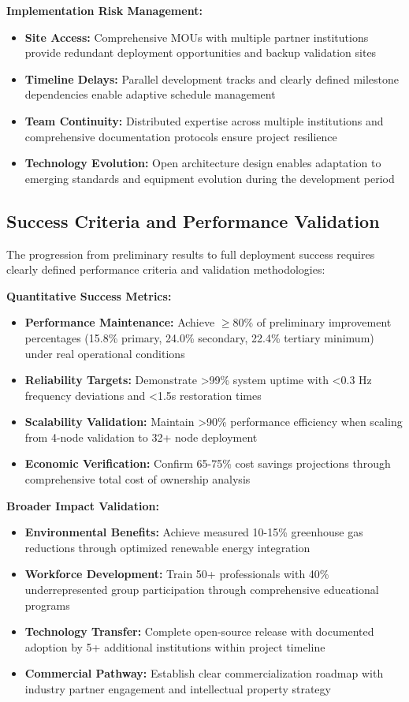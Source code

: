 \documentclass[12pt]{article}
\begin{document}
\textbf{Implementation Risk Management:}
\begin{itemize}
\item \textbf{Site Access:} Comprehensive MOUs with multiple partner institutions provide redundant deployment opportunities and backup validation sites
\item \textbf{Timeline Delays:} Parallel development tracks and clearly defined milestone dependencies enable adaptive schedule management
\item \textbf{Team Continuity:} Distributed expertise across multiple institutions and comprehensive documentation protocols ensure project resilience
\item \textbf{Technology Evolution:} Open architecture design enables adaptation to emerging standards and equipment evolution during the development period
\end{itemize}

\subsection{Success Criteria and Performance Validation}

The progression from preliminary results to full deployment success requires clearly defined performance criteria and validation methodologies:

\textbf{Quantitative Success Metrics:}
\begin{itemize}
\item \textbf{Performance Maintenance:} Achieve $\geq$80\% of preliminary improvement percentages (15.8\% primary, 24.0\% secondary, 22.4\% tertiary minimum) under real operational conditions
\item \textbf{Reliability Targets:} Demonstrate >99\% system uptime with <0.3 Hz frequency deviations and <1.5s restoration times
\item \textbf{Scalability Validation:} Maintain >90\% performance efficiency when scaling from 4-node validation to 32+ node deployment
\item \textbf{Economic Verification:} Confirm 65-75\% cost savings projections through comprehensive total cost of ownership analysis
\end{itemize}

\textbf{Broader Impact Validation:}
\begin{itemize}
\item \textbf{Environmental Benefits:} Achieve measured 10-15\% greenhouse gas reductions through optimized renewable energy integration
\item \textbf{Workforce Development:} Train 50+ professionals with 40\% underrepresented group participation through comprehensive educational programs
\item \textbf{Technology Transfer:} Complete open-source release with documented adoption by 5+ additional institutions within project timeline
\item \textbf{Commercial Pathway:} Establish clear commercialization roadmap with industry partner engagement and intellectual property strategy
\end{itemize}
\end{document}
